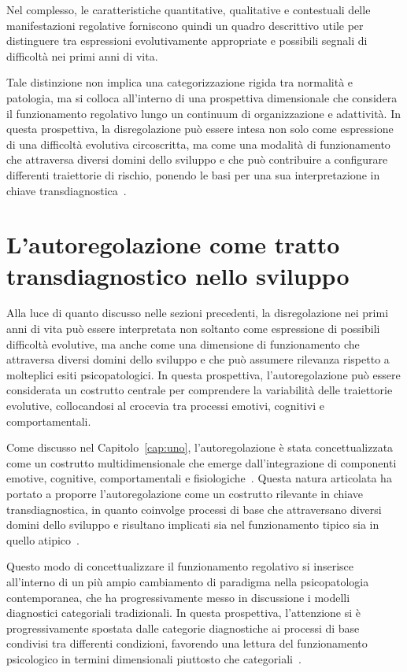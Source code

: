             Nel complesso, le caratteristiche quantitative, qualitative e contestuali delle manifestazioni regolative forniscono quindi un quadro descrittivo utile per distinguere tra espressioni evolutivamente appropriate e possibili segnali di difficoltà nei primi anni di vita.

            Tale distinzione non implica una categorizzazione rigida tra normalità e patologia, ma si colloca all'interno di una prospettiva dimensionale che considera il funzionamento regolativo lungo un continuum di organizzazione e adattività. In questa prospettiva, la disregolazione può essere intesa non solo come espressione di una difficoltà evolutiva circoscritta, ma come una modalità di funzionamento che attraversa diversi domini dello sviluppo e che può contribuire a configurare differenti traiettorie di rischio, ponendo le basi per una sua interpretazione in chiave transdiagnostica~\cite{beauchaine2019,astle2022}.

    \section{L'autoregolazione come tratto transdiagnostico nello sviluppo}
    \label{sec:2_2}

        Alla luce di quanto discusso nelle sezioni precedenti, la disregolazione nei primi anni di vita può essere interpretata non soltanto come espressione di possibili difficoltà evolutive, ma anche come una dimensione di funzionamento che attraversa diversi domini dello sviluppo e che può assumere rilevanza rispetto a molteplici esiti psicopatologici. In questa prospettiva, l'autoregolazione può essere considerata un costrutto centrale per comprendere la variabilità delle traiettorie evolutive, collocandosi al crocevia tra processi emotivi, cognitivi e comportamentali.

        Come discusso nel Capitolo~\ref{cap:uno}, l'autoregolazione è stata concettualizzata come un costrutto multidimensionale che emerge dall'integrazione di componenti emotive, cognitive, comportamentali e fisiologiche~\cite{calkins2007,blair2015}. Questa natura articolata ha portato a proporre l'autoregolazione come un costrutto rilevante in chiave transdiagnostica, in quanto coinvolge processi di base che attraversano diversi domini dello sviluppo e risultano implicati sia nel funzionamento tipico sia in quello atipico~\cite{beauchaine2019}.

        Questo modo di concettualizzare il funzionamento regolativo si inserisce all'interno di un più ampio cambiamento di paradigma nella psicopatologia contemporanea, che ha progressivamente messo in discussione i modelli diagnostici categoriali tradizionali. In questa prospettiva, l'attenzione si è progressivamente spostata dalle categorie diagnostiche ai processi di base condivisi tra differenti condizioni, favorendo una lettura del funzionamento psicologico in termini dimensionali piuttosto che categoriali~\cite{astle2022}.

